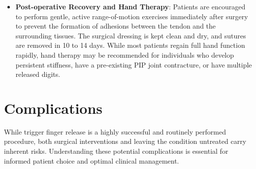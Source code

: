 \begin{itemize}
\begin{itemize}
    \item \textit{Percutaneous Trigger Finger Release}: In this technique, a needle or a specialised micro-scalpel is inserted through the skin directly into the A1 pulley. Using anatomical landmarks, palpation, or real-time ultrasound guidance, the surgeon sweeps the needle or blade longitudinally to divide the A1 pulley. This technique eliminates the need for a surgical incision, resulting in minimal post-operative pain and a faster return to daily activities. However, because the procedure is performed without direct visualisation, it carries a slightly higher risk of incomplete release or injury to the digital nerves, especially in the thumb and index finger where the digital nerves run very close to the pulley.
  \end{itemize}
  \item \textbf{Post-operative Recovery and Hand Therapy}:
  Patients are encouraged to perform gentle, active range-of-motion exercises immediately after surgery to prevent the formation of adhesions between the tendon and the surrounding tissues. The surgical dressing is kept clean and dry, and sutures are removed in 10 to 14 days. While most patients regain full hand function rapidly, hand therapy may be recommended for individuals who develop persistent stiffness, have a pre-existing PIP joint contracture, or have multiple released digits.
\end{itemize}

\section*{Complications}
While trigger finger release is a highly successful and routinely performed procedure, both surgical interventions and leaving the condition untreated carry inherent risks. Understanding these potential complications is essential for informed patient choice and optimal clinical management.


